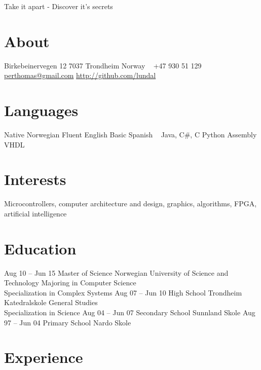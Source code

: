 \documentclass[print]{friggeri-cv}
\begin{document}
       {Take it apart - Discover it's secrets}


\begin{aside}
    \section{About}
        Birkebeinervegen 12
        7037 Trondheim
        Norway
        ~
        +47 930 51 129
        ~
        \href{mailto:perthomas@gmail.com}{perthomas@gmail.com}
        \href{http://github.com/lundal}{http://github.com/lundal}
    \section{Languages}
        Native Norwegian
        Fluent English
        Basic Spanish
        ~
        Java, C\#, C
        Python
        Assembly
        VHDL
\end{aside}

\section{Interests}

Microcontrollers, computer architecture and design, graphics, algorithms, FPGA, artificial intelligence

\section{Education}

\begin{entrylist}
    \entry
        {Aug 10 – Jun 15}
        {Master of Science}
        {Norwegian University of Science and Technology}
        {Majoring in Computer Science\\
        Specialization in Complex Systems}
    \entry
        {Aug 07 – Jun 10}
        {High School}
        {Trondheim Katedralskole}
        {General Studies\\
        Specialization in Science}
    \entry
        {Aug 04 – Jun 07}
        {Secondary School}
        {Sunnland Skole}
        {}
    \entry
        {Aug 97 – Jun 04}
        {Primary School}
        {Nardo Skole}
        {}
\end{entrylist}

\section{Experience}
\end{document}

